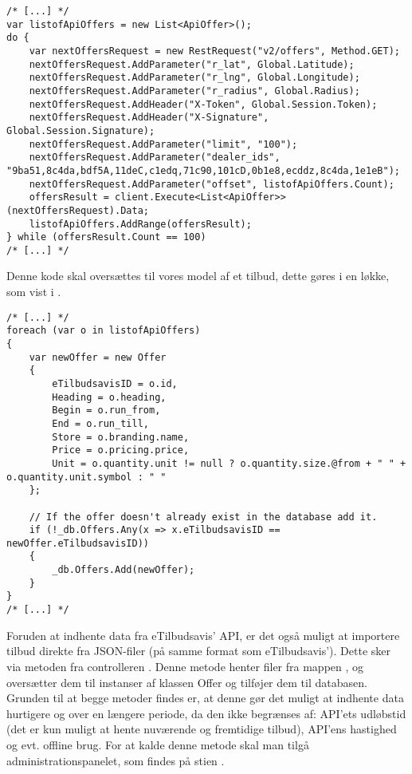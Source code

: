\begin{lstlisting}[caption={C\#-kode som anvender ``/v2/offers'' delen af API'et til at hente tilbud.}, label=apiofferscs]
/* [...] */
var listofApiOffers = new List<ApiOffer>();
do {
    var nextOffersRequest = new RestRequest("v2/offers", Method.GET);
    nextOffersRequest.AddParameter("r_lat", Global.Latitude);
    nextOffersRequest.AddParameter("r_lng", Global.Longitude);
    nextOffersRequest.AddParameter("r_radius", Global.Radius);
    nextOffersRequest.AddHeader("X-Token", Global.Session.Token);
    nextOffersRequest.AddHeader("X-Signature", Global.Session.Signature);
    nextOffersRequest.AddParameter("limit", "100");
    nextOffersRequest.AddParameter("dealer_ids", "9ba51,8c4da,bdf5A,11deC,c1edq,71c90,101cD,0b1e8,ecddz,8c4da,1e1eB");
    nextOffersRequest.AddParameter("offset", listofApiOffers.Count);
    offersResult = client.Execute<List<ApiOffer>>(nextOffersRequest).Data;
    listofApiOffers.AddRange(offersResult);
} while (offersResult.Count == 100)
/* [...] */
\end{lstlisting}

Denne kode skal oversættes til vores model af et tilbud, dette gøres i en  løkke, som vist i .

\begin{lstlisting}[caption={C\#-kode som bruger API-data til at oprette instanser af Offer-klassen, og tilføjer dem til databasen}, label=apiofferstooffercs]
/* [...] */
foreach (var o in listofApiOffers)
{
    var newOffer = new Offer
    {
        eTilbudsavisID = o.id,
        Heading = o.heading,
        Begin = o.run_from,
        End = o.run_till,
        Store = o.branding.name,
        Price = o.pricing.price,
        Unit = o.quantity.unit != null ? o.quantity.size.@from + " " + o.quantity.unit.symbol : " "
    };

    // If the offer doesn't already exist in the database add it.
    if (!_db.Offers.Any(x => x.eTilbudsavisID == newOffer.eTilbudsavisID))
    {
        _db.Offers.Add(newOffer);
    }
}
/* [...] */
\end{lstlisting}

Foruden at indhente data fra eTilbudsavis' API, er det også muligt at importere tilbud direkte fra JSON-filer (på samme format som eTilbudsavis'). 
Dette sker via metoden  fra controlleren . 
Denne metode henter filer fra mappen , og oversætter dem til instanser af klassen Offer og tilføjer dem til databasen. 
Grunden til at begge metoder findes er, at denne gør det muligt at indhente data hurtigere og over en længere periode, da den ikke begrænses af: API'ets udløbstid (det er kun muligt at hente nuværende og fremtidige tilbud), API'ens hastighed og evt. offline brug. 
For at kalde denne metode skal man tilgå administrationspanelet, som findes på stien .


